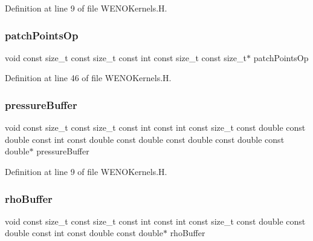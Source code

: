 Definition at line 9 of file W\+E\+N\+O\+Kernels.\+H.

\hypertarget{WENOKernels_8H_a437371152e737bf608b166f946c3bcf4}{}\label{WENOKernels_8H_a437371152e737bf608b166f946c3bcf4} 
\subsubsection{\texorpdfstring{patch\+Points\+Op}{patchPointsOp}}
{\footnotesize\ttfamily void const size\+\_\+t const size\+\_\+t const int const size\+\_\+t const size\+\_\+t$\ast$ patch\+Points\+Op}



Definition at line 46 of file W\+E\+N\+O\+Kernels.\+H.

\hypertarget{WENOKernels_8H_ad7fb6f5370938321db995446ba47c04b}{}\label{WENOKernels_8H_ad7fb6f5370938321db995446ba47c04b} 
\subsubsection{\texorpdfstring{pressure\+Buffer}{pressureBuffer}}
{\footnotesize\ttfamily void const size\+\_\+t const size\+\_\+t const int const int const size\+\_\+t const double const double const int const double const double const double const double const double$\ast$ pressure\+Buffer}



Definition at line 9 of file W\+E\+N\+O\+Kernels.\+H.

\hypertarget{WENOKernels_8H_a7f8551332dfedc9c12724ab3903db88c}{}\label{WENOKernels_8H_a7f8551332dfedc9c12724ab3903db88c} 
\subsubsection{\texorpdfstring{rho\+Buffer}{rhoBuffer}}
{\footnotesize\ttfamily void const size\+\_\+t const size\+\_\+t const int const int const size\+\_\+t const double const double const int const double const double$\ast$ rho\+Buffer}



